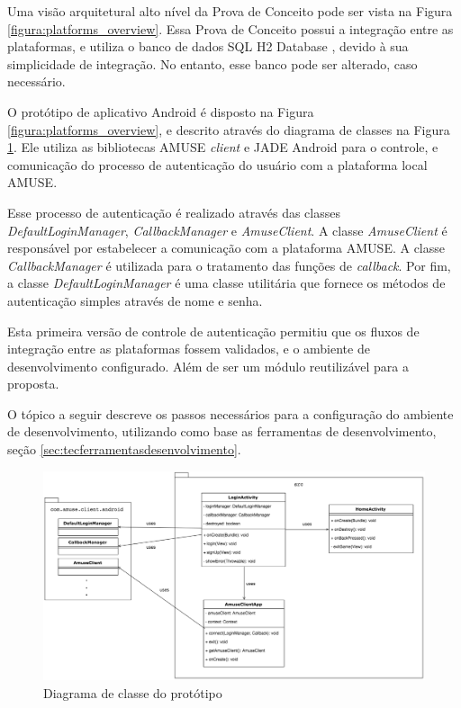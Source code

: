   Uma visão arquitetural alto nível da Prova de Conceito pode ser vista na
  Figura \ref{figura:platforms_overview}. Essa Prova de Conceito possui a
  integração entre as plataformas, e utiliza o banco de dados SQL H2 Database
  \cite{h2db}, devido à sua simplicidade de integração. No entanto, esse banco
  pode ser alterado, caso necessário.

  O protótipo de aplicativo Android é disposto na Figura
  \ref{figura:platforms_overview}, e descrito através do diagrama de classes na
  Figura \ref{figura:class_diagram_prototype}. Ele utiliza as bibliotecas AMUSE
  \textit{client} e JADE Android para o controle, e comunicação do processo de
  autenticação do usuário com a plataforma local AMUSE.

  Esse processo de autenticação é realizado através das classes
  \textit{DefaultLoginManager}, \textit{CallbackManager} e
  \textit{AmuseClient}. A classe \textit{AmuseClient} é responsável por
  estabelecer a comunicação com a plataforma AMUSE. A classe
  \textit{CallbackManager} é utilizada para o tratamento das funções de
  \textit{callback}. Por fim, a classe \textit{DefaultLoginManager} é uma classe
  utilitária que fornece os métodos de autenticação simples através de nome e
  senha.

  Esta primeira versão de controle de autenticação permitiu que os fluxos de
  integração entre as plataformas fossem validados, e o ambiente de
  desenvolvimento configurado. Além de ser um módulo reutilizável para a
  proposta.

  O tópico a seguir descreve os passos necessários para a configuração do
  ambiente de desenvolvimento, utilizando como base as ferramentas de
  desenvolvimento, seção \ref{sec:tecferramentasdesenvolvimento}.

  \begin{figure}[h]
    \centering
    \includegraphics[width=16cm]{figuras/class_diagram_prototype}
    \caption{Diagrama de classe do protótipo }
    \label{figura:class_diagram_prototype}
  \end{figure}

